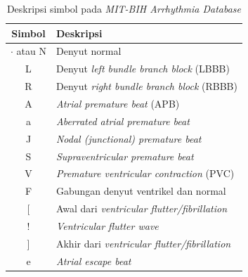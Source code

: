 \begin{table}[H]
    \centering
    \caption{Deskripsi simbol pada \textit{MIT-BIH Arrhythmia Database}}
    \begin{tabular}{|c|l|}
    \hline
    \textbf{Simbol} & {\centering \textbf{Deskripsi}} \\
    \hline
    $\cdot$ atau N & Denyut normal \\
    L & Denyut \textit{left bundle branch block} (LBBB) \\
    R & Denyut \textit{right bundle branch block} (RBBB) \\
    A & \textit{Atrial premature beat} (APB) \\
    a & \textit{Aberrated atrial premature beat} \\
    J & \textit{Nodal (junctional) premature beat} \\
    S & \textit{Supraventricular premature beat} \\
    V & \textit{Premature ventricular contraction} (PVC) \\
    F & Gabungan denyut ventrikel dan normal \\
    {[} & Awal dari \textit{ventricular flutter/fibrillation} \\
    ! & \textit{Ventricular flutter wave} \\
    {]} & Akhir dari \textit{ventricular flutter/fibrillation} \\
    e & \textit{Atrial escape beat} \\

\end{tabular}
\end{table}
